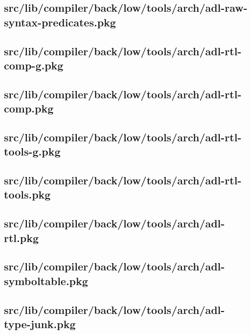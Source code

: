 \subsection{src/lib/compiler/back/low/tools/arch/adl-raw-syntax-predicates.pkg}


\subsection{src/lib/compiler/back/low/tools/arch/adl-rtl-comp-g.pkg}


\subsection{src/lib/compiler/back/low/tools/arch/adl-rtl-comp.pkg}


\subsection{src/lib/compiler/back/low/tools/arch/adl-rtl-tools-g.pkg}


\subsection{src/lib/compiler/back/low/tools/arch/adl-rtl-tools.pkg}


\subsection{src/lib/compiler/back/low/tools/arch/adl-rtl.pkg}


\subsection{src/lib/compiler/back/low/tools/arch/adl-symboltable.pkg}


\subsection{src/lib/compiler/back/low/tools/arch/adl-type-junk.pkg}



